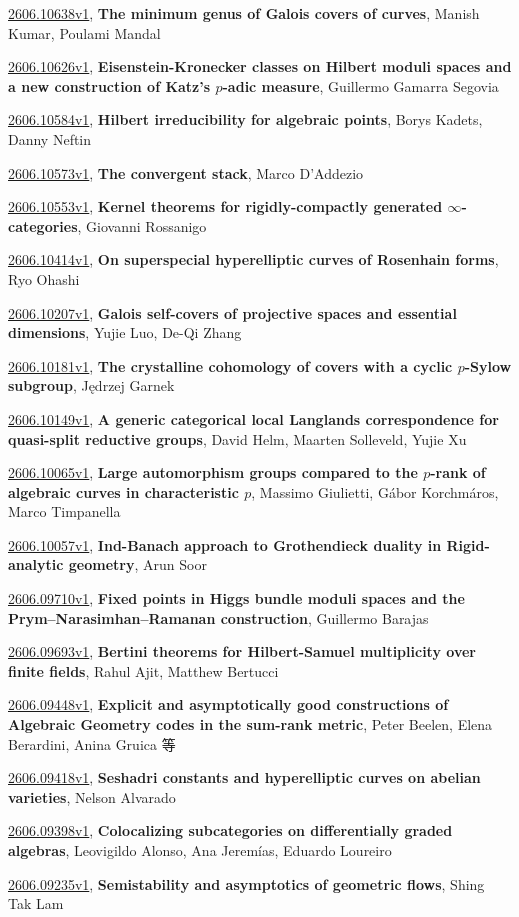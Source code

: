 \documentclass[9pt, a4paper]{article}
\theoremstyle{plain}
\theoremstyle{definition}
\theoremstyle{remark}
\newcommand{\arxiv}[3]{\href{https://arxiv.org/abs/#1}{#1}, \textbf{\textcolor{arxivblue}{#2}}, #3}
\begin{document}
\arxiv{2606.10638v1}{The minimum genus of Galois covers of curves}{Manish Kumar, Poulami Mandal}

\arxiv{2606.10626v1}{Eisenstein-Kronecker classes on Hilbert moduli spaces and a new construction of Katz's $p$-adic measure}{Guillermo Gamarra Segovia}

\arxiv{2606.10584v1}{Hilbert irreducibility for algebraic points}{Borys Kadets, Danny Neftin}

\arxiv{2606.10573v1}{The convergent stack}{Marco D'Addezio}

\arxiv{2606.10553v1}{Kernel theorems for rigidly-compactly generated $\infty$-categories}{Giovanni Rossanigo}

\arxiv{2606.10414v1}{On superspecial hyperelliptic curves of Rosenhain forms}{Ryo Ohashi}

\arxiv{2606.10207v1}{Galois self-covers of projective spaces and essential dimensions}{Yujie Luo, De-Qi Zhang}

\arxiv{2606.10181v1}{The crystalline cohomology of covers with a cyclic $p$-Sylow subgroup}{Jędrzej Garnek}

\arxiv{2606.10149v1}{A generic categorical local Langlands correspondence for quasi-split reductive groups}{David Helm, Maarten Solleveld, Yujie Xu}

\arxiv{2606.10065v1}{Large automorphism groups compared to the $p$-rank of algebraic curves in characteristic $p$}{Massimo Giulietti, Gábor Korchmáros, Marco Timpanella}

\arxiv{2606.10057v1}{Ind-Banach approach to Grothendieck duality in Rigid-analytic geometry}{Arun Soor}

\arxiv{2606.09710v1}{Fixed points in Higgs bundle moduli spaces and the Prym--Narasimhan--Ramanan construction}{Guillermo Barajas}

\arxiv{2606.09693v1}{Bertini theorems for Hilbert-Samuel multiplicity over finite fields}{Rahul Ajit, Matthew Bertucci}

\arxiv{2606.09448v1}{Explicit and asymptotically good constructions of Algebraic Geometry codes in the sum-rank metric}{Peter Beelen, Elena Berardini, Anina Gruica 等}

\arxiv{2606.09418v1}{Seshadri constants and hyperelliptic curves on abelian varieties}{Nelson Alvarado}

\arxiv{2606.09398v1}{Colocalizing subcategories on differentially graded algebras}{Leovigildo Alonso, Ana Jeremías, Eduardo Loureiro}

\arxiv{2606.09235v1}{Semistability and asymptotics of geometric flows}{Shing Tak Lam}
\end{document}
